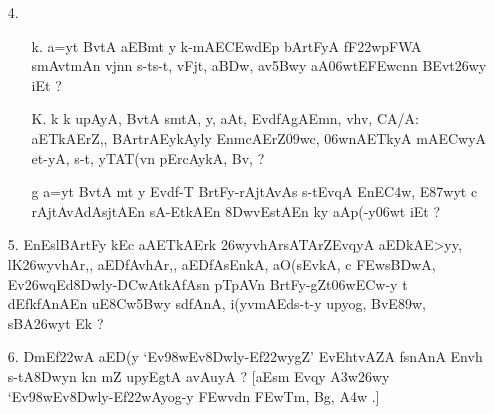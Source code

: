 \def\DevnagVersion{2.15}\documentclass{article}
\begin{document}
\begin{itemize}
\begin{itemize}
                      \item[{\dn g}] {\dn E\392wtFy-yA\2 pA\3D1wvEq\3C8wA\2 yojnAyA\2 s\2-tEf\322wAyA, aEBvD\0nAy k\? upAyA, Bv\306wmt\? avlMvnFyA, .}
                      \end{itemize} 

\item[4.] \begin{itemize}
				\item[{\dn k}.] {\dn a=y\?t BvtA aEBmt\2 y k-mAE\3CEwdEp  bArtFyA fF\322wpFWA smAvt\0mAn vjn\?n s\2-\9{k}ts\2-t\?, vFjt\4, a\3BDw\4, av\35Bwy aA\306wtE\3FEwcn\?n BEvt\326wy\2 iEt {\rs ?\re}}
                
                \item[{\dn K}.] {\dn k\? k\? upAyA, BvtA\2 s\2mtA, y\4, aAt\4, Evd\?fAgAEmn, vhv, CA/A{\rs :\re} aETkAErZ,{\rs ,\re} BArtrAEykAy\?{\qvb}ly\? Enm\0cAErZ\309wc{\rs ,\re} \306wnAETkyA mA\3ECwyA et-yA, s\2-t\?, yTAT\?{\qvb}(v\?n pErcAykA, Bv\?, {\rs ?\re}}
                
                \item[{\dn g}] {\dn a=y\?t BvtA\2 mt y Evd\?f-T\? BrtFy{\rs -\re}rAjtAvAs\? s\2-tEvqA\2 EnE\3C4w, E\387wyt\? c\? rAjtAvAdAsjtAEn sA\2-EtkAEn \38DwvEstAEn ky\0 aAp(-y\306wt\? iEt {\rs ?\re}}
           \end{itemize} 
           
 \item[5.]  {\dn EnEslBArtFy\? k\?Ec aAETkAErk\? \326wyvhAr\?sATArZEvqyA aEDkAE>yy, l\?K\326wyvhAr,{\rs ,\re} aEDfAvhAr,{\rs ,\re} aEDfAsEnkA, aO(sEvkA, c \3FEws\3BDwA, Ev\326wqEd\38Dwly{\rs -\re}\3DCwAtkAfAsn pTpAVn BrtFy{\rs -\re}gZt\306w\3ECw-y t\? d\?EfkfAnAEn uE\38Cw\35Bwy s\2d\?fAnA{\rs ,\re} i(y\?vmAEds\2-t-y upyog, BvE\389w, s\2BA\326wyt\? Ek {\rs ?\re}}
 
 \item[6.] {Dm\0Ef\322wA aED(y {\rs `\re}Ev\398wEv\38Dwly{\rs -\re}Ef\322wy\?g\?Z{\rs '\re} EvEhtvA\0ZA\2 f\2snAnA\2 Env\0h\?{\rs ,\re} s\2-tA\38Dwyn\2 k\?n mZ upy\?EgtA avAuyA {\rs ?\re} {\rs [\re}aEsm Evqy\? \3A3w\326wy {\rs `\re}Ev\398wEv\38Dwly{\rs -\re}Ef\322wAyog-y \3FEwv\?dn \3FEwTm, Bg, {\dnnum {} \3A4w  .}{\rs ]\re}}   
 

\end{itemize}
\end{document}
